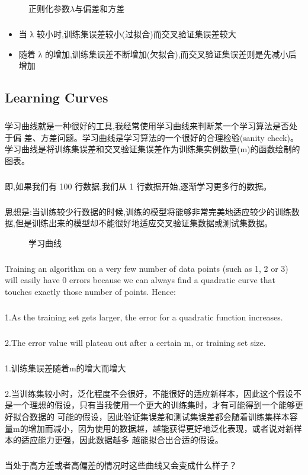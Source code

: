 \documentclass{article}
\begin{document}
\begin{CJK}{UTF8}{gbsn}
\begin{figure}[H]
\label{fig:633}
\caption{正则化参数$\lambda$与偏差和方差}
\end{figure}
\subparagraph{}
\begin{itemize}
\item 当 λ 较小时,训练集误差较小(过拟合)而交叉验证集误差较大
\item 随着 λ 的增加,训练集误差不断增加(欠拟合),而交叉验证集误差则是先减小后
增加
\end{itemize}
\begin{figure}[H]
\label{fig:631}
\end{figure}
\begin{figure}[H]
\label{fig:632}
\end{figure}
\subsection{Learning Curves}
\subparagraph{}
学习曲线就是一种很好的工具,我经常使用学习曲线来判断某一个学习算法是否处于偏
差、方差问题。学习曲线是学习算法的一个很好的合理检验(sanity check)。学习曲线是将训练集误差和交叉验证集误差作为训练集实例数量(m)的函数绘制的图表。
\subparagraph{}
即,如果我们有 100 行数据,我们从 1 行数据开始,逐渐学习更多行的数据。
\subparagraph{}
思想是:当训练较少行数据的时候,训练的模型将能够非常完美地适应较少的训练数据,但是训练出来的模型却不能很好地适应交叉验证集数据或测试集数据。
\begin{figure}[H]
\label{fig:635}
\caption{学习曲线}
\end{figure}
\subparagraph{}
Training an algorithm on a very few number of data points (such as 1, 2 or 3) will easily have 0 errors because we can always find a quadratic curve that touches exactly those number of points. Hence:
\subparagraph{}
1.As the training set gets larger, the error for a quadratic function increases.
\subparagraph{}
2.The error value will plateau out after a certain m, or training set size.
\subparagraph{}
1.训练集误差随着m的增大而增大
\subparagraph{}
2.当训练集较小时，泛化程度不会很好，不能很好的适应新样本，因此这个假设不是一个理想的假设，只有当我使用一个更大的训练集时，才有可能得到一个能够更好拟合数据的 可能的假设，因此验证集误差和测试集误差都会随着训练集样本容量m的增加而减小，因为使用的数据越，越能获得更好地泛化表现，或者说对新样本的适应能力更强，因此数据越多 越能拟合出合适的假设。
\subparagraph{}
当处于高方差或者高偏差的情况时这些曲线又会变成什么样子？

\end{CJK}
\end{document}
